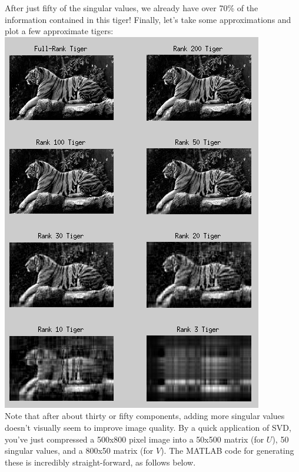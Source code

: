 \documentclass[11pt]{article}
\begin{document}
After just fifty of the singular values, we already have over 70\% of the information contained in
this tiger! Finally, let's take some approximations and plot a few approximate tigers:\\
\includegraphics[scale=0.6]{images/tigers.png}\\

Note that after about thirty or fifty components, adding more singular values doesn't visually seem
to improve image quality. By a quick application of SVD, you've just compressed a 500x800 pixel
image into a 50x500 matrix (for $U$), 50 singular values, and a 800x50 matrix (for $V$). The MATLAB
code for generating these is incredibly straight-forward, as follows below.\\
\end{document}
